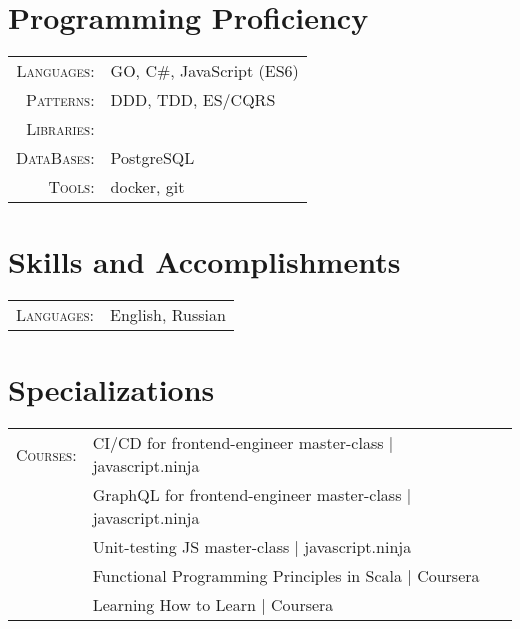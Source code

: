 \documentclass[a4paper,11pt]{article}
\begin{document}
\section{Programming Proficiency}
\begin{tabular}{rl}
  \textsc{Languages:}& GO, C\#, JavaScript (ES6)\\
  \textsc{Patterns:}& DDD, TDD, ES/CQRS\\
  \textsc{Libraries:}& \\
  \textsc{DataBases:}& PostgreSQL\\ %
  \textsc{Tools:}& docker, git\\
\end{tabular}

\section{Skills and Accomplishments}
\begin{tabular}{rl}
  \textsc{Languages:}& English, Russian\\
\end{tabular}

\section{Specializations}
\begin{tabular}{rl}
  \textsc{Courses:}
  &CI/CD for frontend-engineer master-class | javascript.ninja \\
  &GraphQL for frontend-engineer master-class | javascript.ninja \\
  &Unit-testing JS master-class | javascript.ninja \\
  &Functional Programming Principles in Scala | Coursera\\
  &Learning How to Learn | Coursera\\
\end{tabular}
\end{document}
